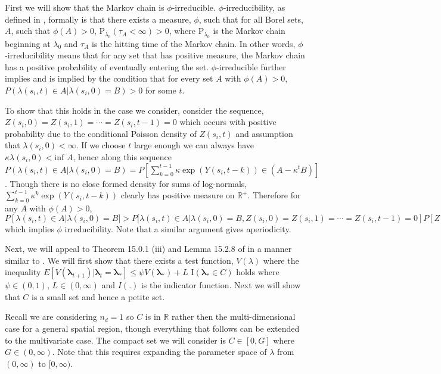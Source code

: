\documentclass[11pt]{isuthesis}
\begin{document}
First we will show that the Markov chain is $\phi$-irreducible.  $\phi$-irreducibility, as defined in \cite{meyn2012markov}, formally is that there exists a measure, $\phi$, such that for all Borel sets, $A$, such that $\phi(A)>0$, $\mbox{P}_{\lambda_0}(\tau_A<\infty)>0$, where $\mbox{P}_{\lambda_0}$ is the Markov chain beginning at $\lambda_0$ and $\tau_A$ is the hitting time of the Markov chain.  In other words, $\phi$-irreducibility means that for any set that has positive measure, the Markov chain has a positive probability of eventually entering the set.  $\phi$-irreducible further implies and is implied by the condition that for every set $A$ with $\phi(A)>0$, $P(\lambda(s_i,t)\in A|\lambda(s_i,0)=B)>0$ for some $t$.  

To show that this holds in the case we consider, consider the sequence, $Z(s_i,0)=Z(s_i,1)=\cdots=Z(s_i,t-1)=0$ which occurs with positive probability due to the conditional Poisson density of $Z(s_i,t)$ and assumption that $\lambda(s_i,0)< \infty$.  If we choose $t$ large enough we can always have $\kappa\lambda(s_i,0) < \mbox{inf } A$, hence along this sequence $P(\lambda(s_i,t)\in A|\lambda(s_i,0)=B)= P[\sum_{k=0}^{t-1} \kappa\exp(Y(s_i,t-k))\in (A-\kappa^t B)]$.  Though there is no close formed density for sums of log-normals, $\sum_{k=0}^{t-1} \kappa^k\exp(Y(s_i,t-k))$ clearly has positive measure on $\mathbb{R}^{+}$.  Therefore for any $A$ with $\phi(A)>0$, $P[\lambda(s_i,t)\in A|\lambda(s_i,0)=B]>P[\lambda(s_i,t)\in A|\lambda(s_i,0)=B,Z(s_i,0)=Z(s_i,1)=\cdots=Z(s_i,t-1)=0]P[Z(s_i,0)=Z(s_i,1)=\cdots=Z(s_i,t-1)=0]|\lambda(s_i,0)=B>0$ which implies $\phi$ irreducibility.  Note that a similar argument gives aperiodicity.

Next, we will appeal to Theorem 15.0.1 (iii) and Lemma 15.2.8 of \cite{meyn2012markov} in a manner similar to \cite{fokianos2009poisson}. We will first show that there exists a test function, $V(\lambda)$ where the inequality $E[V(\boldsymbol{\lambda}_{t+1})|\boldsymbol{\lambda}_t=\boldsymbol{\lambda_*}]\leq \psi V(\boldsymbol{\lambda_*})+L \mbox{ I}(\boldsymbol{\lambda_*} \in C)$ holds where $\psi \in (0,1)$, $L \in (0,\infty)$ and $I(.)$ is the indicator function.  Next we will show that $C$ is a small set and hence a petite set.

Recall we are considering $n_d=1$ so $C$ is in $\mathbb{R}$ rather then the multi-dimensional case for a general spatial region, though everything that follows can be extended to the multivariate case.  The compact set we will consider is $C \in [0,G]$ where  $G \in (0,\infty)$.  Note that this requires expanding the parameter space of $\lambda$ from $(0,\infty)$ to $[0,\infty)$.
\end{document}
